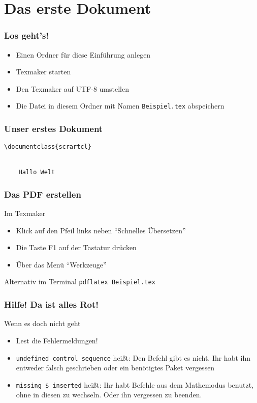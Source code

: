 \section{Das erste Dokument}

\begin{frame}
    \frametitle{Los geht's!}
    \begin{itemize}
        \item Einen Ordner für diese Einführung anlegen
        \item Texmaker starten
        \item Den Texmaker auf UTF-8 umstellen
        \item Die Datei in diesem Ordner mit Namen \texttt{Beispiel.tex} abspeichern
    \end{itemize}
\end{frame}


\begin{frame}[fragile]
    \frametitle{Unser erstes Dokument}
    \begin{codeblock}
    \begin{verbatim}
\documentclass{scrartcl}


    Hallo Welt

\end{verbatim}
    \end{codeblock}
\end{frame}


\begin{frame}[fragile]
    \frametitle{Das PDF erstellen}
    \begin{block}{Im Texmaker}
        \begin{itemize}
            \item Klick auf den Pfeil links neben \enquote{Schnelles Übersetzen}
            \item Die Taste F1 auf der Tastatur drücken
            \item Über das Menü \enquote{Werkzeuge}
        \end{itemize}
    \end{block}
    
    \bigskip
    \begin{block}{Alternativ im Terminal}
        \verb+pdflatex Beispiel.tex+
    \end{block}
\end{frame}


\begin{frame}
    \frametitle{Hilfe! Da ist alles Rot!}
    \begin{alertblock}{Wenn es doch nicht geht}
	    \begin{itemize}
	        \item Lest die Fehlermeldungen!
	        \item \texttt{undefined control sequence} heißt: Den Befehl gibt es nicht. Ihr habt ihn entweder falsch geschrieben oder ein benötigtes Paket vergessen
	        \item \texttt{missing \$ inserted} heißt: Ihr habt Befehle aus dem Mathemodus benutzt, ohne in diesen zu wechseln. Oder ihn vergessen zu beenden.
	    \end{itemize}
    \end{alertblock}
\end{frame}


